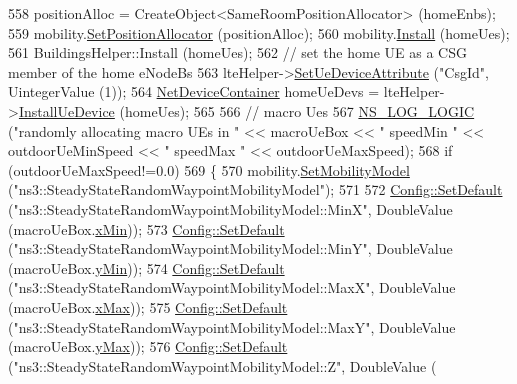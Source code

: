 \begin{DoxyCode}
558   positionAlloc = CreateObject<SameRoomPositionAllocator> (homeEnbs);
559   mobility.\hyperlink{classns3_1_1MobilityHelper_ac59d5295076be3cc11021566713a28c5}{SetPositionAllocator} (positionAlloc);
560   mobility.\hyperlink{classns3_1_1MobilityHelper_a07737960ee95c0777109cf2994dd97ae}{Install} (homeUes);
561   BuildingsHelper::Install (homeUes);
562   \textcolor{comment}{// set the home UE as a CSG member of the home eNodeBs}
563   lteHelper->\hyperlink{classns3_1_1LteHelper_ae85f256c4356b977d60a877dbbea1857}{SetUeDeviceAttribute} (\textcolor{stringliteral}{"CsgId"}, UintegerValue (1));
564   \hyperlink{classns3_1_1NetDeviceContainer}{NetDeviceContainer} homeUeDevs = lteHelper->\hyperlink{classns3_1_1LteHelper_ac9cd932d7de92811cfa953c2e3b2fc9f}{InstallUeDevice} (homeUes);
565 
566   \textcolor{comment}{// macro Ues}
567   \hyperlink{group__logging_ga88acd260151caf2db9c0fc84997f45ce}{NS\_LOG\_LOGIC} (\textcolor{stringliteral}{"randomly allocating macro UEs in "} << macroUeBox << \textcolor{stringliteral}{" speedMin "} << 
      outdoorUeMinSpeed << \textcolor{stringliteral}{" speedMax "} << outdoorUeMaxSpeed);
568   \textcolor{keywordflow}{if} (outdoorUeMaxSpeed!=0.0)
569     \{
570       mobility.\hyperlink{classns3_1_1MobilityHelper_a030275011b6f40682e70534d30280aba}{SetMobilityModel} (\textcolor{stringliteral}{"ns3::SteadyStateRandomWaypointMobilityModel"});
571       
572       \hyperlink{group__config_ga2e7882df849d8ba4aaad31c934c40c06}{Config::SetDefault} (\textcolor{stringliteral}{"ns3::SteadyStateRandomWaypointMobilityModel::MinX"}, 
      DoubleValue (macroUeBox.\hyperlink{classns3_1_1Box_a1fd6a43d53258323331d34da600ff1c5}{xMin}));
573       \hyperlink{group__config_ga2e7882df849d8ba4aaad31c934c40c06}{Config::SetDefault} (\textcolor{stringliteral}{"ns3::SteadyStateRandomWaypointMobilityModel::MinY"}, 
      DoubleValue (macroUeBox.\hyperlink{classns3_1_1Box_a3865ed092f941186823539c9979002f8}{yMin}));
574       \hyperlink{group__config_ga2e7882df849d8ba4aaad31c934c40c06}{Config::SetDefault} (\textcolor{stringliteral}{"ns3::SteadyStateRandomWaypointMobilityModel::MaxX"}, 
      DoubleValue (macroUeBox.\hyperlink{classns3_1_1Box_a50021049c756e770329145b25d9533a2}{xMax}));
575       \hyperlink{group__config_ga2e7882df849d8ba4aaad31c934c40c06}{Config::SetDefault} (\textcolor{stringliteral}{"ns3::SteadyStateRandomWaypointMobilityModel::MaxY"}, 
      DoubleValue (macroUeBox.\hyperlink{classns3_1_1Box_a001fd430a14b19efe925c818a332e392}{yMax}));
576       \hyperlink{group__config_ga2e7882df849d8ba4aaad31c934c40c06}{Config::SetDefault} (\textcolor{stringliteral}{"ns3::SteadyStateRandomWaypointMobilityModel::Z"}, DoubleValue (

\end{DoxyCode}
